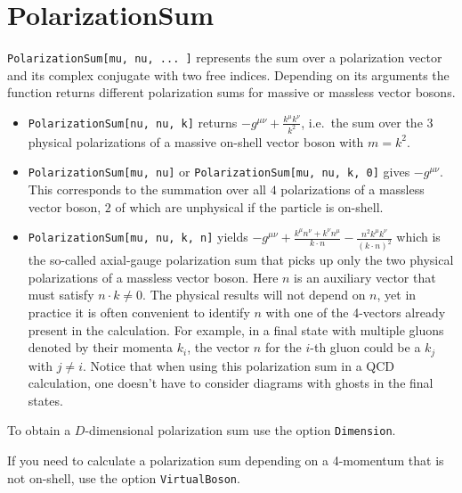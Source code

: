 \documentclass[../FeynCalcManual.tex]{subfiles}
\begin{document}
\hypertarget{polarizationsum}{
\section{PolarizationSum}\label{polarizationsum}}

\texttt{PolarizationSum[\allowbreak{}mu,\ \allowbreak{}nu,\ \allowbreak{}... ]}
represents the sum over a polarization vector and its complex conjugate
with two free indices. Depending on its arguments the function returns
different polarization sums for massive or massless vector bosons.

\begin{itemize}
\tightlist
\item
  \texttt{PolarizationSum[\allowbreak{}nu,\ \allowbreak{}nu,\ \allowbreak{}k]}
  returns \(-g^{\mu \nu}+\frac{k^{\mu} k^{\nu}}{k^2}\), i.e.~the sum
  over the 3 physical polarizations of a massive on-shell vector boson
  with \(m = k^2\).
\item
  \texttt{PolarizationSum[\allowbreak{}mu,\ \allowbreak{}nu]} or
  \texttt{PolarizationSum[\allowbreak{}mu,\ \allowbreak{}nu,\ \allowbreak{}k,\ \allowbreak{}0]}
  gives \(-g^{\mu \nu }\). This corresponds to the summation over all
  \(4\) polarizations of a massless vector boson, \(2\) of which are
  unphysical if the particle is on-shell.
\item
  \texttt{PolarizationSum[\allowbreak{}mu,\ \allowbreak{}nu,\ \allowbreak{}k,\ \allowbreak{}n]}
  yields
  \(-g^{\mu \nu}+\frac{k^{\mu }n^{\nu}+k^{\nu }n^{\mu }}{k \cdot n} - \frac{n^2 k^{\mu}k^{\nu}}{(k \cdot n)^2}\)
  which is the so-called axial-gauge polarization sum that picks up only
  the two physical polarizations of a massless vector boson. Here \(n\)
  is an auxiliary vector that must satisfy \(n \cdot k \neq 0\). The
  physical results will not depend on \(n\), yet in practice it is often
  convenient to identify \(n\) with one of the 4-vectors already present
  in the calculation. For example, in a final state with multiple gluons
  denoted by their momenta \(k_i\), the vector \(n\) for the \(i\)-th
  gluon could be a \(k_j\) with \(j \neq i\). Notice that when using
  this polarization sum in a QCD calculation, one doesn't have to
  consider diagrams with ghosts in the final states.
\end{itemize}

To obtain a \(D\)-dimensional polarization sum use the option
\texttt{Dimension}.

If you need to calculate a polarization sum depending on a 4-momentum
that is not on-shell, use the option \texttt{VirtualBoson}.
\end{document}
